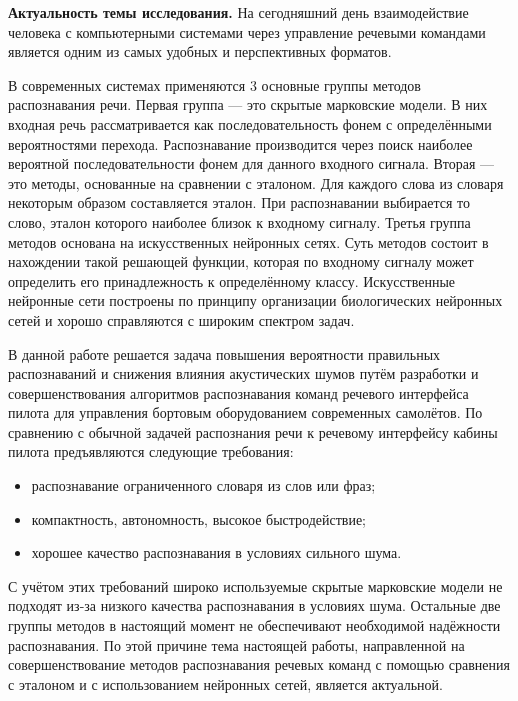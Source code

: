 \textbf{Актуальность темы исследования.}
На сегодняшний день взаимодействие человека с компьютерными системами через управление речевыми командами является одним из самых удобных и перспективных форматов.

В современных системах применяются 3 основные группы методов распознавания речи.
Первая группа --- это скрытые марковские модели.
В них входная речь рассматривается как последовательность фонем с определёнными вероятностями перехода.
Распознавание производится через поиск наиболее вероятной последовательности фонем для данного входного сигнала.
Вторая --- это методы, основанные на сравнении с эталоном.
Для каждого слова из словаря некоторым образом составляется эталон.
При распознавании выбирается то слово, эталон которого наиболее близок к входному сигналу.
Третья группа методов основана на искусственных нейронных сетях.
Суть методов состоит в нахождении такой решающей функции, которая по входному сигналу может определить его принадлежность к определённому классу.
Искусственные нейронные сети построены по принципу организации биологических нейронных сетей и хорошо справляются с широким спектром задач.

В данной работе решается задача повышения вероятности правильных распознаваний и снижения влияния акустических шумов путём разработки и совершенствования алгоритмов распознавания команд речевого интерфейса пилота для управления бортовым оборудованием современных самолётов.
По сравнению с обычной задачей распознания речи к речевому интерфейсу кабины пилота предъявляются следующие требования:

\begin{itemize}
	\item распознавание ограниченного словаря из слов или фраз;
	\item компактность, автономность, высокое быстродействие;
	\item хорошее качество распознавания в условиях сильного шума.
\end{itemize}

С учётом этих требований широко используемые скрытые марковские модели не подходят из-за низкого качества распознавания в условиях шума.
Остальные две группы методов в настоящий момент не обеспечивают необходимой надёжности распознавания.
По этой причине тема настоящей работы, направленной на совершенствование методов распознавания речевых команд с помощью сравнения с эталоном и с использованием нейронных сетей, является актуальной.

